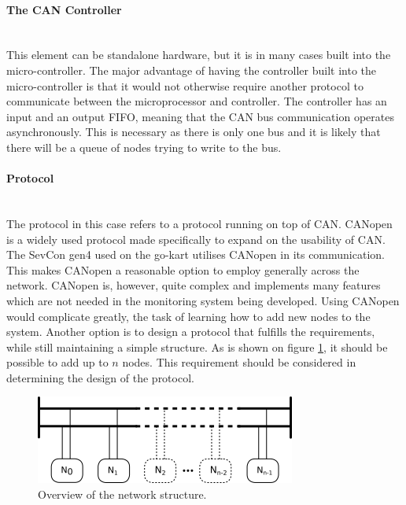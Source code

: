 \paragraph*{The CAN Controller}~\\
This element can be standalone hardware, but it is in many cases built into the micro-controller.
The major advantage of having the controller built into the micro-controller is that it would not otherwise require another protocol to communicate between the microprocessor and controller.
The controller has an input and an output FIFO, meaning that the CAN bus communication operates asynchronously. 
This is necessary as there is only one bus and it is likely that there will be a queue of nodes trying to write to the bus.

\paragraph*{Protocol}~\\
The protocol in this case refers to a protocol running on top of CAN.
CANopen is a widely used protocol made specifically to expand on the usability of CAN.
The SevCon gen4 used on the go-kart utilises CANopen in its communication.
This makes CANopen a reasonable option to employ generally across the network.
CANopen is, however, quite complex and implements many features which are not needed in the monitoring system being developed.
Using CANopen would complicate greatly, the task of learning how to add new nodes to the system.
Another option is to design a protocol that fulfills the requirements,
while still maintaining a simple structure.
As is shown on figure \ref{fig:analysisnodes}, it should be possible to add up to $n$ nodes.
This requirement should be considered in determining the design of the protocol.

\begin{figure}
	\centering
	\includegraphics[width=.75\linewidth]{graphics/analysis_nodes}
	\caption{Overview of the network structure.}
	\label{fig:analysisnodes}
\end{figure}

